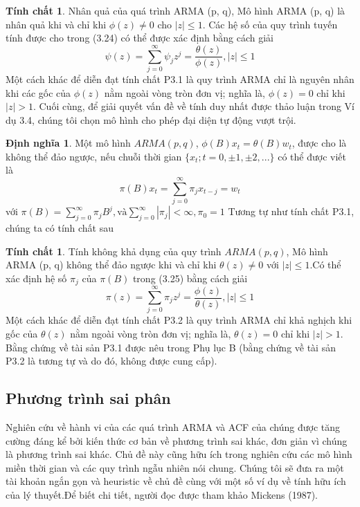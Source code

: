 \documentclass[12pt, a4paper,oneside]{book}
\theoremstyle{definition}
\newtheorem{dn}[theo]{Định nghĩa}
\newtheorem{tc}[theo]{Tính chất}
\begin{document}
\begin{tc}
	Nhân quả của quá trình ARMA (p, q), Mô hình ARMA (p, q) là nhân quả khi và chỉ khi $\phi(z) \neq 0$ cho $| z | \leq1$. Các hệ số của quy trình tuyến tính được cho trong (3.24) có thể được xác định bằng cách giải
	$$\psi(z)= \sum_{j=0}^{\infty}\psi_{j}z^{j}= \dfrac{\theta(z)}{\phi(z)}, |z|\leq1$$
	Một cách khác để diễn đạt tính chất P3.1 là quy trình ARMA chỉ là nguyên nhân khi các gốc của $\phi(z)$ nằm ngoài vòng tròn đơn vị; nghĩa là, $\phi(z) = 0$ chỉ khi $| z | > 1$. Cuối cùng, để giải quyết vấn đề về tính duy nhất được thảo luận trong Ví dụ 3.4, chúng tôi chọn mô hình cho phép đại diện tự động vượt trội.
\end{tc}
\begin{dn}
	Một mô hình $ARMA (p, q)$, $\phi(B)x_{t} = \theta(B)w_{t}$, được cho là không thể đảo ngược, nếu chuỗi thời gian $\{x_{t}; t = 0, \pm 1, \pm2, ...\}$ có thể được viết là 
	$$\pi(B)x_{t}= \sum_{j=0}^{\infty}\pi_{j}x_{t-j} = w_{t}$$
	với $\pi(B)= \sum_{j=0}^{\infty}\pi_{j}B^{j}, \text{và} \sum_{j=0}^{\infty}|\pi_{j}| < \infty, \pi_{0}=1$ 
	Tương tự như tính chất P3.1, chúng ta có tính chất sau 
\end{dn}
\begin{tc}
	Tính không khả dụng của quy trình $ARMA (p, q)$, Mô hình ARMA (p, q) không thể đảo ngược khi và chỉ khi $\theta(z) \neq0$ với $| z | \leq1$.Có thể xác định hệ số $\pi_{j}$ của $\pi(B)$ trong (3.25) bằng cách giải 
	$$\pi(z)= \sum_{j=0}^{\infty}\pi_{j}z^{j} = \dfrac{\phi(z)}{\theta(z)}, |z|\leq1$$
	Một cách khác để diễn đạt tính chất P3.2 là quy trình ARMA chỉ khả nghịch khi gốc của $\theta(z)$ nằm ngoài vòng tròn đơn vị; nghĩa là, $\theta(z) = 0$ chỉ khi $| z | > 1$. Bằng chứng về tài sản P3.1 được nêu trong Phụ lục B (bằng chứng về tài sản P3.2 là tương tự và do đó, không được cung cấp).
\end{tc}

\subsection{Phương trình sai phân}
	Nghiên cứu về hành vi của các quá trình ARMA và ACF của chúng được tăng cường đáng kể bởi kiến thức cơ bản về phương trình sai khác, đơn giản vì chúng là phương trình sai khác. Chủ đề này cũng hữu ích trong nghiên cứu các mô hình miền thời gian và các quy trình ngẫu nhiên nói chung. Chúng tôi sẽ đưa ra một tài khoản ngắn gọn và heuristic về chủ đề cùng với một số ví dụ về tính hữu ích của lý thuyết.Để biết chi tiết, người đọc được tham khảo Mickens (1987).
\end{document}
